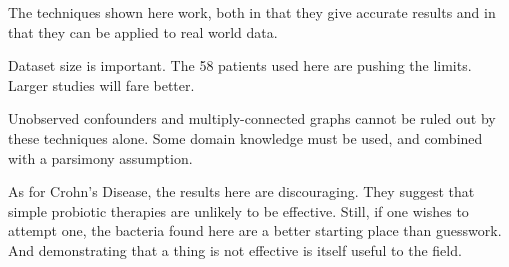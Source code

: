 \documentclass[letterpaper]{article}
\begin{document}
The techniques shown here work, both in that they give accurate
results and in that they can be applied to real world data.

Dataset size is important.  The 58 patients used here are pushing the
limits.  Larger studies will fare better.

Unobserved confounders and multiply-connected graphs cannot be ruled
out by these techniques alone.  Some domain knowledge must be used,
and combined with a parsimony assumption.

As for Crohn's Disease, the results here are discouraging.  They
suggest that simple probiotic therapies are unlikely to be effective.
Still, if one wishes to attempt one, the bacteria found here are a
better starting place than guesswork.  And demonstrating that a thing
is not effective is itself useful to the field.

\printbibliography
\end{document}
